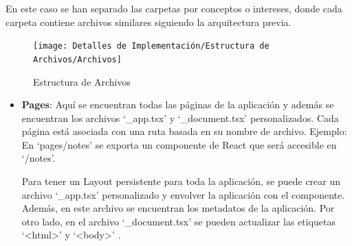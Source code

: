 \documentclass[12pt,twoside,titlepage]{report}
\begin{document}
En este caso se han separado las carpetas por conceptos o intereses, donde cada carpeta contiene archivos similares siguiendo la arquitectura previa.

\begin{figure}[H]
    \centering
    \texttt{[image: Detalles de Implementación/Estructura de Archivos/Archivos]}
    \label{fig:Archivos}
    \caption{Estructura de Archivos}
\end{figure}

\begin{itemize}
    \item \textbf{Pages}: Aquí se encuentran todas las páginas de la aplicación y además se encuentran los archivos ‘\_app.tsx’ y ‘\_document.tsx’ personalizados. Cada página está asociada con una ruta basada en su nombre de archivo. Ejemplo: En ‘pages/notes’ se exporta un componente de React que será accesible en ‘/notes’.
    
        Para tener un Layout persistente para toda la aplicación, se puede crear un archivo ‘\_app.tsx’ personalizado y envolver la aplicación con el componente. Además, en este archivo se encuentran los metadatos de la aplicación. Por otro lado, en el archivo ‘\_document.tsx’ se pueden actualizar las etiquetas ‘<html>’ y ‘<body>’ .
    

\end{itemize}
\end{document}
